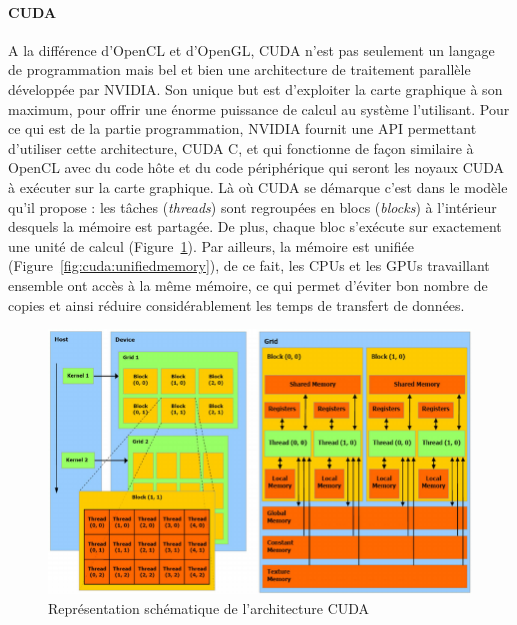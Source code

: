 \paragraph{CUDA} A la différence d'OpenCL et d'OpenGL, CUDA n'est pas seulement un langage de programmation mais bel et bien une architecture de traitement parallèle développée par NVIDIA. Son unique but est d'exploiter la carte graphique à son maximum, pour offrir une énorme puissance de calcul au système l'utilisant. Pour ce qui est de la partie programmation, NVIDIA fournit une API permettant d'utiliser cette architecture, CUDA C, et qui fonctionne de façon similaire à OpenCL avec du code hôte et du code périphérique qui seront les noyaux CUDA à exécuter sur la carte graphique. Là où CUDA se démarque c'est dans le modèle qu'il propose : les tâches (\emph{threads}) sont regroupées en blocs (\emph{blocks}) à l'intérieur desquels la mémoire est partagée. De plus, chaque bloc s'exécute sur exactement une unité de calcul (Figure~\ref{fig:cuda:archi}). Par ailleurs, la mémoire est unifiée (Figure~\ref{fig:cuda:unifiedmemory}), de ce fait, les CPUs et les GPUs travaillant ensemble ont accès à la même mémoire, ce qui permet d'éviter bon nombre de copies et ainsi réduire considérablement les temps de transfert de données.

\begin{figure}[H]
\centering
\includegraphics[width=0.9\linewidth]{images/cuda-archi}
\caption{Représentation schématique de l'architecture CUDA\protect\footnotemark}
\label{fig:cuda:archi}
\end{figure}

